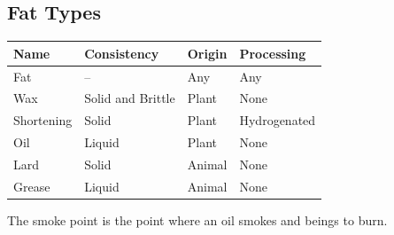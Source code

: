 \subsection{Fat Types}
\begin{tabular}{|llll|}
\hline
Name & Consistency & Origin & Processing\\
\hline
Fat & -- & Any & Any\\
Wax & Solid and Brittle & Plant & None \\
Shortening & Solid & Plant & Hydrogenated \\
Oil & Liquid & Plant & None \\
Lard & Solid & Animal & None \\
Grease & Liquid & Animal & None \\
\hline
\end{tabular}
\bigskip


The smoke point is the point where an oil smokes and beings to burn.


